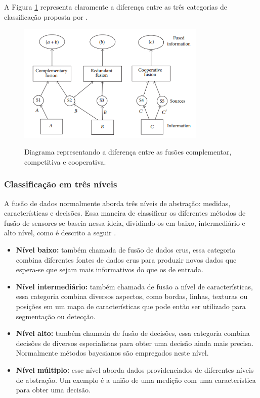 \documentclass[acronym, symbols, table]{fei}
\begin{document}
				A Figura \ref{fig:classificacao_fusao_de_sensores} representa claramente a diferença entre as três categorias de classificação proposta por \textcite{castanedo2013review}.
			
				\begin{figure}[!htb]
					\centering
					\caption{Diagrama representando a diferença entre as fusões complementar, competitiva e cooperativa.} 
					\includegraphics[width=0.8\textwidth]{classificacao_fusao_de_sensores.png}
					\label{fig:classificacao_fusao_de_sensores}
				\end{figure}
			
			\subsubsection{Classificação em três níveis}
			
				A fusão de dados normalmente aborda três níveis de abstração: medidas, características e decisões. Essa maneira de classificar os diferentes métodos de fusão de sensores se baseia nessa ideia, dividindo-os em baixo, intermediário e alto nível, como é descrito a seguir \cite{castanedo2013review}.
			
				\begin{itemize}
					\item \textbf{Nível baixo:} também chamada de fusão de dados crus, essa categoria combina diferentes fontes de dados crus para produzir novos dados que espera-se que sejam mais informativos do que os de entrada.
					
					\item \textbf{Nível intermediário:} também chamada de fusão a nível de características, essa categoria combina diversos aspectos, como bordas, linhas, texturas ou posições em um mapa de características que pode então ser utilizado para segmentação ou detecção.
					
					\item \textbf{Nível alto:} também chamada de fusão de decisões, essa categoria combina decisões de diversos especialistas para obter uma decisão ainda mais precisa. Normalmente métodos bayesianos são empregados neste nível.
					
					\item \textbf{Nível múltiplo:} esse nível aborda dados providenciados de diferentes níveis de abstração. Um exemplo é a união de uma medição com uma característica para obter uma decisão.
				\end{itemize}
			
\end{document}
